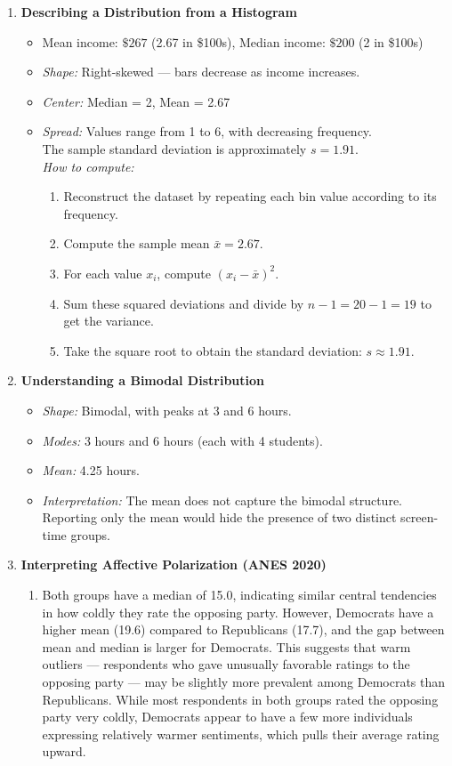 \documentclass{article}
\begin{document}
\begin{enumerate}
\item \textbf{Describing a Distribution from a Histogram}
  \begin{itemize}
    \item Mean income: $\$267$ (2.67 in \$100s), Median income: $\${200}$ (2 in \$100s)
    \item \textit{Shape:} Right-skewed — bars decrease as income increases.
    \item \textit{Center:} Median = 2, Mean = 2.67
    \item \textit{Spread:} Values range from 1 to 6, with decreasing frequency.\\
      The sample standard deviation is approximately $s = 1.91$.\\
      \textit{How to compute:}
      \begin{enumerate}
        \item Reconstruct the dataset by repeating each bin value according to its frequency.
        \item Compute the sample mean $\bar{x} = 2.67$.
        \item For each value $x_i$, compute $(x_i - \bar{x})^2$.
        \item Sum these squared deviations and divide by $n - 1 = 20 - 1 = 19$ to get the variance.
        \item Take the square root to obtain the standard deviation: $s \approx 1.91$.
      \end{enumerate}
  \end{itemize}


  \item \textbf{Understanding a Bimodal Distribution}
  \begin{itemize}
    \item \textit{Shape:} Bimodal, with peaks at 3 and 6 hours.
    \item \textit{Modes:} 3 hours and 6 hours (each with 4 students).
    \item \textit{Mean:} 4.25 hours.
    \item \textit{Interpretation:} The mean does not capture the bimodal structure. Reporting only the mean would hide the presence of two distinct screen-time groups.
  \end{itemize}

\item \textbf{Interpreting Affective Polarization (ANES 2020)}
  \begin{enumerate}
    \item Both groups have a median of 15.0, indicating similar central tendencies in how coldly they rate the opposing party. However, Democrats have a higher mean (19.6) compared to Republicans (17.7), and the gap between mean and median is larger for Democrats. This suggests that warm outliers — respondents who gave unusually favorable ratings to the opposing party — may be slightly more prevalent among Democrats than Republicans. While most respondents in both groups rated the opposing party very coldly, Democrats appear to have a few more individuals expressing relatively warmer sentiments, which pulls their average rating upward.


\end{enumerate}
\end{enumerate}
\end{document}
